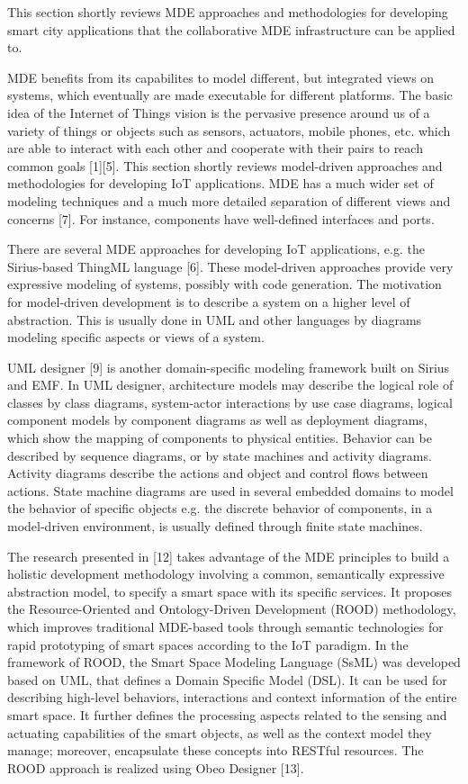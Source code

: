 This section shortly reviews MDE approaches and methodologies for developing smart city applications that the collaborative MDE infrastructure can be applied to.

MDE benefits from its capabilites to model different, but integrated views on systems, which eventually  are made executable for different platforms. The basic idea of the Internet of Things vision is the pervasive presence around us of a variety of things or objects such as sensors, actuators, mobile phones, etc. which are able to interact with each other and cooperate with their pairs to reach common goals [1][5]. This section shortly reviews model-driven approaches and methodologies for developing IoT applications. MDE has a much wider set of modeling techniques and a much more detailed separation of different views and concerns [7]. For instance, components have well-defined interfaces and ports.

There are several MDE approaches for developing IoT applications, e.g. the Sirius-based ThingML language [6]. These model-driven approaches provide very expressive modeling of systems, possibly with code generation. The motivation for model-driven development is to describe a system on a higher level of abstraction. This is usually done in UML and other languages by diagrams modeling specific aspects or views of a system.

UML designer [9] is another domain-specific modeling framework built on Sirius and EMF. In UML designer, architecture models may describe the logical role of classes by class diagrams, system-actor interactions by use case diagrams, logical component models by component diagrams as well as deployment diagrams, which show the mapping of components to physical entities. Behavior can be described by sequence diagrams, or by state machines and activity diagrams. Activity diagrams describe the actions and object and control flows between actions. State machine diagrams are used in several embedded domains to model the behavior of specific objects e.g. the discrete behavior of components, in a model-driven environment, is usually defined through finite state machines. 

The research presented in [12] takes advantage of the MDE principles to build a holistic development methodology involving a common, semantically expressive abstraction model, to specify a smart space with its specific services. It proposes the Resource-Oriented and Ontology-Driven Development (ROOD) methodology, which improves traditional MDE-based tools through semantic technologies for rapid prototyping of smart spaces according to the IoT paradigm. In the framework of ROOD, the Smart Space Modeling Language (SsML) was developed based on UML, that defines a Domain Specific Model (DSL). It can be used for describing high-level behaviors, interactions and context information of the entire smart space. It further defines the processing aspects related to the sensing and actuating capabilities of the smart objects, as well as the context model they manage; moreover, encapsulate these concepts into RESTful resources. The ROOD approach is realized using Obeo Designer [13].